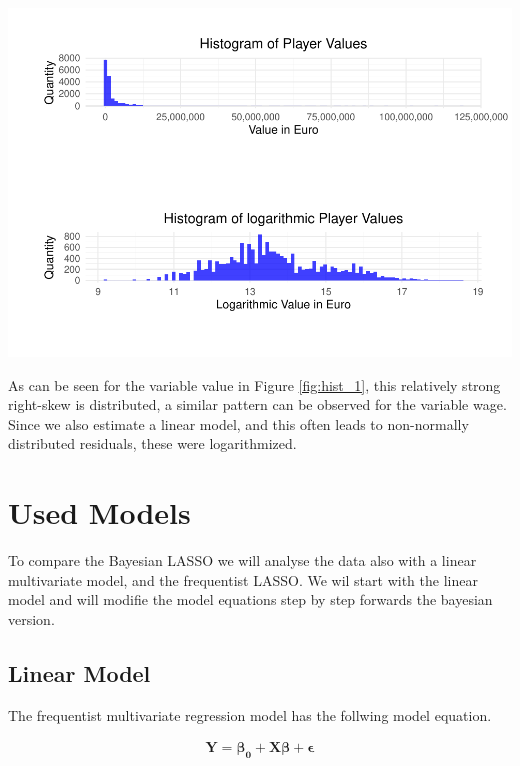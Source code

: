 \documentclass[12pt,a4paper]{article}
\let\origfigure\figure
\let\endorigfigure\endfigure
\renewenvironment{figure}[1][2] {
    \expandafter\origfigure\expandafter[H]
} {
    \endorigfigure
}
\begin{document}
\begin{figure}
\centering
\includegraphics{term_paper_bayes_files/figure-latex/fig1-1.pdf}
\caption{\label{fig:hist_1} Histograms of player values and log player
values}
\end{figure}

As can be seen for the variable value in Figure \ref{fig:hist_1}, this
relatively strong right-skew is distributed, a similar pattern can be
observed for the variable wage. Since we also estimate a linear model,
and this often leads to non-normally distributed residuals, these were
logarithmized.

\newpage

\hypertarget{used-models}{%
\section{Used Models}\label{used-models}}

To compare the Bayesian \ac{LASSO} we will analyse the data also with a
linear multivariate model, and the frequentist \ac{LASSO}. We wil start
with the linear model and will modifie the model equations step by step
forwards the bayesian version.

\hypertarget{linear-model}{%
\subsection{Linear Model}\label{linear-model}}

The frequentist multivariate regression model has the follwing model
equation.

\begin{align}
\label{eq:lm}
\pmb{Y = \beta_0 + X \beta} + \pmb{\epsilon}
\end{align}
\end{document}
